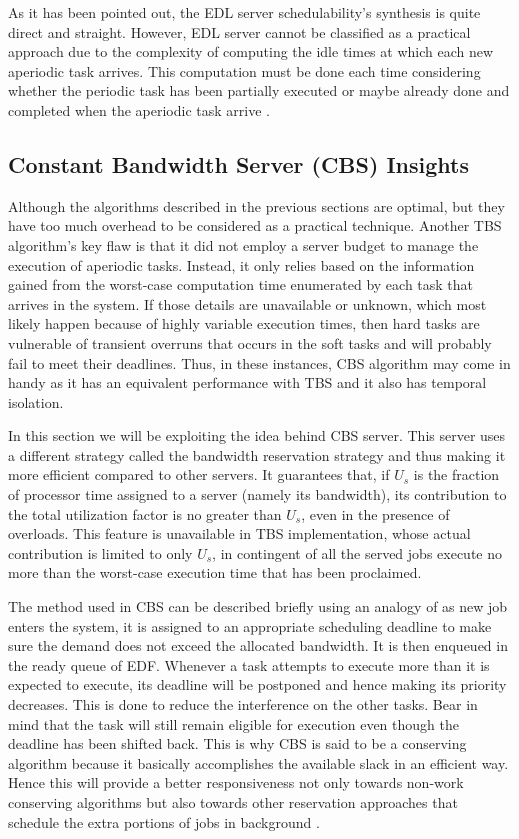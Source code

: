 As it has been pointed out, the EDL server schedulability’s synthesis is quite direct and straight. However, EDL server cannot be classified as a practical approach due to the complexity of computing the idle times at which each new aperiodic task arrives. This computation must be done each time considering whether the periodic task has been partially executed or maybe already done and completed when the aperiodic task arrive \cite{b8}.

\subsection{Constant Bandwidth Server (CBS) Insights}

Although the algorithms described in the previous sections are optimal, but they have too much overhead to be considered as a practical technique. Another TBS algorithm's key flaw is that it did not employ a server budget to manage the execution of aperiodic tasks. Instead, it only relies based on the information gained from the worst-case computation time enumerated by each task that arrives in the system. If those details are unavailable or unknown, which most likely happen because of highly variable execution times, then hard tasks are vulnerable of transient overruns that occurs in the soft tasks and will probably fail to meet their deadlines. Thus, in these instances, CBS algorithm may come in handy as it has an equivalent performance with TBS and it also has temporal isolation. 

In this section we will be exploiting the idea behind CBS server. This server uses a different strategy called the bandwidth reservation strategy and thus making it more efficient compared to other servers. It guarantees that, if $U_{s}$ is the fraction of processor time assigned to a server (namely its bandwidth), its contribution to the total utilization factor is no greater than $U_{s}$, even in the presence of overloads. This feature is unavailable in TBS implementation, whose actual contribution is limited to only $U_{s}$, in contingent of all the served jobs execute no more than the worst-case execution time that has been proclaimed.

The method used in CBS can be described briefly using an analogy of as new job enters the system, it is assigned to an appropriate scheduling deadline to make sure the demand does not exceed the allocated bandwidth. It is then enqueued in the ready queue of EDF. Whenever a task attempts to execute more than it is expected to execute, its deadline will be postponed and hence making its priority decreases. This is done to reduce the interference on the other tasks. Bear in mind that the task will still remain eligible for execution even though the deadline has been shifted back. This is why CBS is said to be a conserving algorithm because it basically accomplishes the available slack in an efficient way. Hence this will provide a better responsiveness not only towards non-work conserving algorithms but also towards other reservation approaches that schedule the extra portions of jobs in background \cite{b1}.

